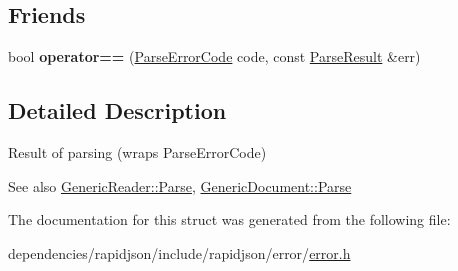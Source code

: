 \subsection*{Friends}
\begin{DoxyCompactItemize}
\item 
\mbox{\label{struct_parse_result_a58c9982e833d1c74686506ac7449200c}} 
bool {\bfseries operator==} (\hyperlink{group___r_a_p_i_d_j_s_o_n___e_r_r_o_r_s_ga8d4b32dfc45840bca189ade2bbcb6ba7}{Parse\+Error\+Code} code, const \hyperlink{struct_parse_result}{Parse\+Result} \&err)
\end{DoxyCompactItemize}


\subsection{Detailed Description}
Result of parsing (wraps Parse\+Error\+Code) 


 \begin{DoxySeeAlso}{See also}
\hyperlink{class_generic_reader_a0c450620d14ff1824e58bb7bd9b42099}{Generic\+Reader\+::\+Parse}, \hyperlink{class_generic_document_aadee36db7064cc9894a75c848831cdae}{Generic\+Document\+::\+Parse} 
\end{DoxySeeAlso}


The documentation for this struct was generated from the following file\+:\begin{DoxyCompactItemize}
\item 
dependencies/rapidjson/include/rapidjson/error/\hyperlink{error_8h}{error.\+h}\end{DoxyCompactItemize}
